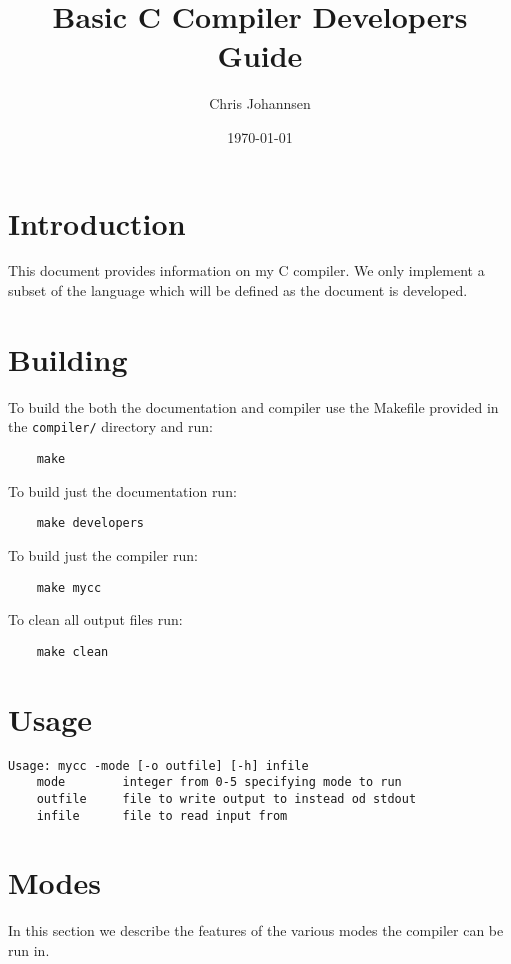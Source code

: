 \documentclass{article}
\title{Basic C Compiler Developers Guide}
\author{Chris Johannsen}
\date{\today}
\begin{document}
\maketitle

\section{Introduction}

This document provides information on my C compiler. We only implement a subset of the language which will be defined as the document is developed.

\section{Building}

To build the both the documentation and compiler use the Makefile provided in the \verb|compiler/| directory and run:

\begin{verbatim}
    make
\end{verbatim}

\noindent To build just the documentation run:

\begin{verbatim}
    make developers
\end{verbatim}

\noindent To build just the compiler run:

\begin{verbatim}
    make mycc
\end{verbatim}

\noindent To clean all output files run:

\begin{verbatim}
    make clean
\end{verbatim}

\section{Usage}

\begin{verbatim}
Usage: mycc -mode [-o outfile] [-h] infile
    mode        integer from 0-5 specifying mode to run
    outfile     file to write output to instead od stdout
    infile      file to read input from
\end{verbatim}

\section{Modes}

In this section we describe the features of the various modes the compiler can be run in.




\end{document}

